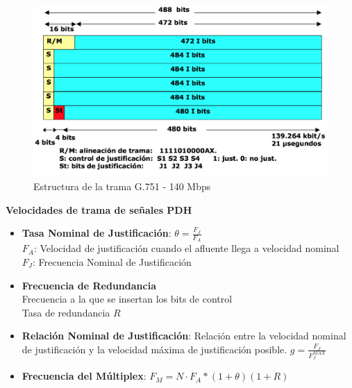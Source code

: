 \documentclass[10pt,portrait, twocolumn]{article}
\makeatletter
\renewcommand{\subsubsection}{\@startsection{subsubsection}{3}{0mm}%
                                {-1ex plus -.5ex minus -.2ex}%
                                {1ex plus .2ex}%
                                {\normalfont\small\bfseries}}
\makeatother
\begin{document}

	
	\begin{figure}[!ht]
 		\centering
  		 \includegraphics[scale = 0.3]{images/TramaG7512}
		\caption{Estructura de la trama G.751 - 140 Mbps}
	\end{figure}	

\textbf{Velocidades de trama de señales PDH}

	\begin{itemize}
		\item \textbf{Tasa Nominal de Justificación}: $\theta = \frac{F_{J}}{F_{A}}$\\
				\quad $F_{A}$: Velocidad de justificación cuando el afluente llega a velocidad nominal\\
				\quad $F_{J}$: Frecuencia Nominal de Justificación
		\item \textbf{Frecuencia de Redundancia}\\
			\quad Frecuencia a la que se insertan los bits de control \\
			\quad Tasa de redundancia $R$
		\item \textbf{Relación Nominal de Justificación}: Relación entre la velocidad nominal de justificación  y la velocidad máxima de justificación posible. $g = \frac{F_{J}}{F_{J}^{MAX}}$
		\item \textbf{Frecuencia del Múltiplex}: $F_{M} = N \cdot F_{A} * (1 + \theta) (1 + R)$
	\end{itemize}
\end{document}
